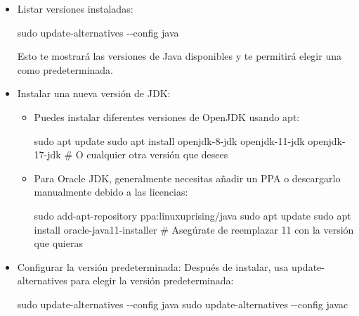 \documentclass[
  jou,
  floatsintext,
  longtable,
  a4paper,
  nolmodern,
  notxfonts,
  notimes,
  12pt,
  colorlinks=true,linkcolor=blue,citecolor=blue,urlcolor=blue]{apa7}
\newenvironment{Shaded}{\begin{snugshade}}{\end{snugshade}}
\newcommand{\AttributeTok}[1]{\textcolor[rgb]{0.40,0.45,0.13}{#1}}
\newcommand{\CommentTok}[1]{\textcolor[rgb]{0.37,0.37,0.37}{#1}}
\newcommand{\FunctionTok}[1]{\textcolor[rgb]{0.28,0.35,0.67}{#1}}
\newcommand{\NormalTok}[1]{\textcolor[rgb]{0.00,0.23,0.31}{#1}}
\begin{document}
\begin{itemize}
\item
  Listar versiones instaladas:

\begin{Shaded}
\begin{Highlighting}[]
\FunctionTok{sudo}\NormalTok{ update{-}alternatives }\AttributeTok{{-}{-}config}\NormalTok{ java}
\end{Highlighting}
\end{Shaded}

  Esto te mostrará las versiones de Java disponibles y te permitirá
  elegir una como predeterminada.
\item
  Instalar una nueva versión de JDK:

  \begin{itemize}
  \item
    Puedes instalar diferentes versiones de OpenJDK usando apt:

\begin{Shaded}
\begin{Highlighting}[]
\FunctionTok{sudo}\NormalTok{ apt update}
\FunctionTok{sudo}\NormalTok{ apt install openjdk{-}8{-}jdk openjdk{-}11{-}jdk openjdk{-}17{-}jdk  }\CommentTok{\# O cualquier otra versión que desees}
\end{Highlighting}
\end{Shaded}
  \item
    Para Oracle JDK, generalmente necesitas añadir un PPA o descargarlo
    manualmente debido a las licencias:

\begin{Shaded}
\begin{Highlighting}[]
\FunctionTok{sudo}\NormalTok{ add{-}apt{-}repository ppa:linuxuprising/java}
\FunctionTok{sudo}\NormalTok{ apt update}
\FunctionTok{sudo}\NormalTok{ apt install oracle{-}java11{-}installer  }\CommentTok{\# Asegúrate de reemplazar 11 con la versión que quieras}
\end{Highlighting}
\end{Shaded}
  \end{itemize}
\item
  Configurar la versión predeterminada: Después de instalar, usa
  update-alternatives para elegir la versión predeterminada:

\begin{Shaded}
\begin{Highlighting}[]
\FunctionTok{sudo}\NormalTok{ update{-}alternatives }\AttributeTok{{-}{-}config}\NormalTok{ java}
\FunctionTok{sudo}\NormalTok{ update{-}alternatives }\AttributeTok{{-}{-}config}\NormalTok{ javac}
\end{Highlighting}
\end{Shaded}
\end{itemize}
\end{document}
